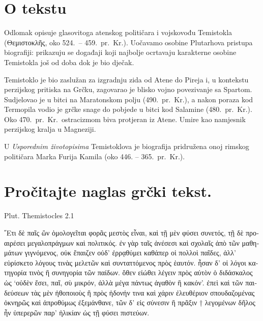 


\section*{O tekstu}

Odlomak opisuje glasovitoga atenskog političara i vojskovođu Temistokla \textgreek[variant=ancient]{(Θεμιστοκλῆς}, oko 524.\ – 459.\ pr.~Kr.). Uočavamo osobine Plutarhova pristupa biografiji: prikazuju se događaji koji najbolje ocrtavaju karakterne osobine Temistokla još od doba dok je bio dječak. 

Temistoklo je bio zaslužan za izgradnju zida od Atene do Pireja i, u kontekstu perzijskog pritiska na Grčku, zagovarao je blisko vojno povezivanje sa Spartom. Sudjelovao je u bitci na Maratonskom polju (490.\ pr.~Kr.), a nakon poraza kod Termopila vodio je grčke snage do pobjede u bitci kod Salamine (480.\ pr.~Kr.). Oko 470.\ pr.~Kr.\ ostracizmom biva protjeran iz Atene. Umire kao namjesnik perzijskog kralja u Magneziji. 

U \textit{Usporednim životopisima} Temistoklova je biografija pridružena onoj rimskog političara Marka Furija Kamila (oko 446. – 365.\ pr.~Kr.). 


\section*{Pročitajte naglas grčki tekst.}
Plut. Themistocles 2.1

\medskip

{\large
\begin{greek}
\noindent ῎Ετι δὲ παῖς ὢν ὁμολογεῖται φορᾶς μεστὸς εἶναι, καὶ τῇ μὲν φύσει συνετός, τῇ δὲ προαιρέσει μεγαλοπράγμων καὶ πολιτικός. ἐν γὰρ ταῖς ἀνέσεσι καὶ σχολαῖς ἀπὸ τῶν μαθημάτων γιγνόμενος, οὐκ ἔπαιζεν οὐδ' ἐρρᾳθύμει καθάπερ οἱ πολλοὶ παῖδες, ἀλλ' εὑρίσκετο λόγους τινὰς μελετῶν καὶ συνταττόμενος πρὸς ἑαυτόν. ἦσαν δ' οἱ λόγοι κατηγορία τινὸς ἢ συνηγορία τῶν παίδων. ὅθεν εἰώθει λέγειν πρὸς αὐτὸν ὁ διδάσκαλος ὡς ‘οὐδὲν ἔσει, παῖ, σὺ μικρόν, ἀλλὰ μέγα πάντως ἀγαθὸν ἢ κακόν’. ἐπεὶ καὶ τῶν παιδεύσεων τὰς μὲν ἠθοποιοὺς ἢ πρὸς ἡδονήν τινα καὶ χάριν ἐλευθέριον σπουδαζομένας ὀκνηρῶς καὶ ἀπροθύμως ἐξεμάνθανε, τῶν δ' εἰς σύνεσιν ἢ πρᾶξιν † λεγομένων δῆλος ἦν ὑπερερῶν παρ' ἡλικίαν ὡς τῇ φύσει πιστεύων.

\end{greek}
}

